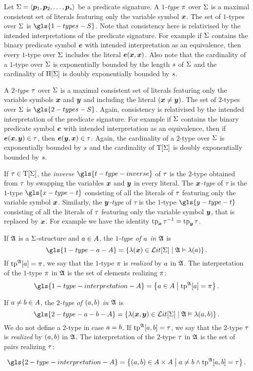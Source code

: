 Let $\mathrm{\Sigma} = \left\langle \bm{p}_{1}, \bm{p}_{2}, \dots, \bm{p}_{s} \right\rangle$ be a predicate signature.
A \emph{$1$-type} $\pi$ over $\mathrm{\Sigma}$ is a maximal consistent set of literals
featuring only the variable symbol $\bm{x}$.
The set of $1$-types over $\mathrm{\Sigma}$ is $\gls{1-types-S}$.
Note that consistency here is relativised by the intended interpretations of the
predicate signature. For example if $\mathrm{\Sigma}$ contains the binary predicate symbol
$\bm{e}$ with intended interpretation as an equivalence, then every $1$-type over
$\mathrm{\Sigma}$ includes the literal $\bm{e}(\bm{x},\bm{x})$.
Also note that the cardinality of a $1$-type over $\mathrm{\Sigma}$ is exponentially
bounded by the length $s$ of $\mathrm{\Sigma}$ and the cardinality of $\Pi[\mathrm{\Sigma}]$ is
doubly exponentially bounded by $s$.

A \emph{$2$-type} $\tau$ over $\mathrm{\Sigma}$ is a maximal consistent set of literals
featuring only the variable symbols $\bm{x}$ and $\bm{y}$ and including the literal
$(\bm{x} \neq \bm{y})$.
The set of $2$-types over $\mathrm{\Sigma}$ is $\gls{2-types-S}$.
Again, consistency is relativised by the intended interpretation of the
predicate signature. For example if $\mathrm{\Sigma}$ contains the binary predicate symbol
$\bm{e}$ with intended interpretation as an equivalence, then if $\bm{e}(\bm{x}, \bm{y}) \in
\tau$, then $\bm{e}(\bm{y}, \bm{x}) \in \tau$.
Again, the cardinality of a $2$-type over $\mathrm{\Sigma}$ is exponentially bounded by
$s$ and the cardinality of $\mathrm{T}[\mathrm{\Sigma}]$ is doubly exponentially bounded by
$s$.

If $\tau \in \mathrm{T}[\mathrm{\Sigma}]$, the \emph{inverse} $\gls{t-type-inverse}$ of $\tau$
is the $2$-type obtained from $\tau$ by
swapping the variables $\bm{x}$ and $\bm{y}$ in every literal.
The \emph{$\bm{x}$-type} of $\tau$ is the $1$-type $\gls{x-type-t}$
consisting of all the literals of $\tau$ featuring only the variable symbol
$\bm{x}$. Similarly, the \emph{$\bm{y}$-type} of $\tau$ is the $1$-type
$\gls{y-type-t}$ consisting of all the literals of $\tau$ featuring only the
variable symbol $\bm{y}$, that is replaced by $\bm{x}$.
For example we have the identity $\operatorname{tp}_{\bm{x}}\tau^{-1} = \operatorname{tp}_{\bm{y}}\tau$.

If $\mathfrak{A}$ is a $\mathrm{\Sigma}$-structure and $a \in A$, the \emph{$1$-type of
$a$ in $\mathfrak{A}$} is
\[
  \gls{1-type-a-A} = \setbd{\litl(\xx) \in \LitF\SigS}{\StrA \vDash \litl(\ea)}.
\]
If $\operatorname{tp}^{\mathfrak{A}}[a] = \pi$, we say that the $1$-type $\pi$ is \emph{realized}
by $a$ in $\mathfrak{A}$. The interpretation of the $1$-type $\pi$ in $\mathfrak{A}$ is
the set of elements realizing $\pi$:
\[
  \gls{1-type-interpretation-A} = \setbd{\ea \in \domA}{\tpIa\StrA\ea = \tpIp}.
\]

If $a \neq b \in A$, the \emph{$2$-type of $(a, b)$ in $\mathfrak{A}$} is
\[
  \gls{2-type-a-b-A} = \setbd{\litl(\xx,\yy) \in \LitF\SigS}{\StrA \vDash
  \litl(\ea, \eb)}.
\]
We do not define a $2$-type in case $a = b$.
If $\operatorname{tp}^{\mathfrak{A}}[a,b] = \tau$, we say that the $2$-type $\tau$ is
\emph{realized} by $(a, b)$ in $\mathfrak{A}$. The interpretation of the $2$-type
$\tau$ in $\mathfrak{A}$ is the set of pairs realizing $\tau$:

\[
  \gls{2-type-interpretation-A} = \setbd{(\ea, \eb) \in
  \domA\cprod\domA}{\ea \neq \eb \land \tpIab\StrA\ea\eb = \tpTt}.
\]